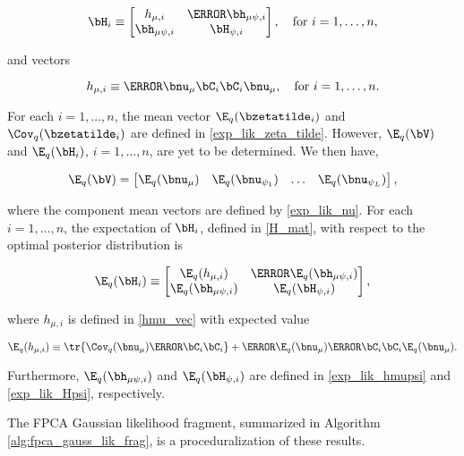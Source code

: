 \documentclass[12pt]{article}
\def\numu{\bnu_\mu}
\newcommand\nupsi[1]{\bnu_{\psi_{#1}}}
\newcommand\hmu[1]{h_{\mu, i}}
\newcommand\hmupsi[1]{\bh_{\mu \psi, i}}
\newcommand\Hpsi[1]{\bH_{\psi, i}}
\theoremstyle{plain}
\theoremstyle{definition}
\theoremstyle{remark}
\begin{document}
\begin{equation}
	\bH_i \equiv \begin{bmatrix}
		\hmu{i} & \T{\hmupsi{i}} \\
		\hmupsi{i} & \Hpsi{i}
	\end{bmatrix}, \quad
	\text{for $i = 1, \dots, n$},
\label{H_mat}
\end{equation}

\noindent and vectors

\begin{equation}
	\hmu{i} \equiv \T{\numu} \bC_i \bC_i \numu, \quad
	\text{for $i = 1, \dots, n$}.
\label{hmu_vec}
\end{equation}

\noindent For each $i = 1, \dots, n$, the mean vector $\E_q (\bzetatilde_i)$ and $\Cov_q (\bzetatilde_i)$ are defined in
\eqref{exp_lik_zeta_tilde}. However, $\E_q (\bV)$ and $\E_q (\bH_i)$, $i = 1, \dots, n$, are yet to be determined.
We then have,

\[
	\E_q (\bV) = \begin{bmatrix}
		\E_q (\numu) & \E_q (\nupsi{1}) & \dots & \E_q (\nupsi{L})
	\end{bmatrix},
\]

\noindent where the component mean vectors are defined by \eqref{exp_lik_nu}.
For each $i = 1, \dots, n$, the expectation of $\bH_i$, defined in \eqref{H_mat},
with respect to the optimal posterior distribution is

\[
	\E_q (\bH_i) \equiv \begin{bmatrix}
		\E_q (\hmu{i}) & \T{\E_q (\hmupsi{i})} \\
		\E_q (\hmupsi{i}) & \E_q (\Hpsi{i})
	\end{bmatrix},
\]

\noindent where $\hmu{i}$ is defined in \eqref{hmu_vec} with expected value

\[
	\E_q (\hmu{i}) \equiv
		\tr \{ \Cov_q (\numu) \T{\bC_i} \bC_i \}
		+ \T{\E_q (\numu)} \T{\bC_i} \bC_i \E_q (\numu).
\]

\noindent Furthermore, $\E_q (\hmupsi{i})$ and $\E_q (\Hpsi{i})$ are defined in \eqref{exp_lik_hmupsi} and
\eqref{exp_lik_Hpsi}, respectively.

The FPCA Gaussian likelihood fragment, summarized in Algorithm \ref{alg:fpca_gauss_lik_frag}, is a
proceduralization of these results.

\end{document}
